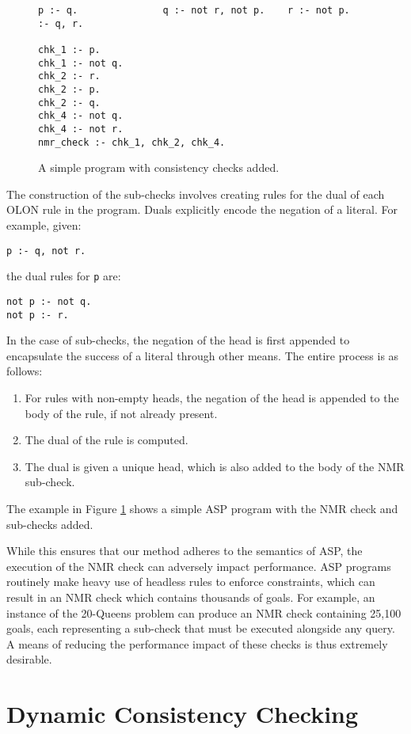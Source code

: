 \documentclass{new_tlp}
\begin{document}
\begin{figure}
\figrule
\begin{verbatim}
p :- q.               q :- not r, not p.    r :- not p.           :- q, r.              

chk_1 :- p.
chk_1 :- not q.
chk_2 :- r.
chk_2 :- p.
chk_2 :- q.
chk_4 :- not q.
chk_4 :- not r.
nmr_check :- chk_1, chk_2, chk_4.
\end{verbatim}
\caption{A simple program with consistency checks added.} \label{fig:nmrexample}
\figrule
\end{figure}

The construction of the sub-checks involves creating rules for the dual of each 
OLON rule in the program. Duals explicitly encode the negation of a literal.
For example, given:
\begin{verbatim}
p :- q, not r.
\end{verbatim}
\noindent the dual rules for \texttt{p} are:
\begin{verbatim}
not p :- not q.
not p :- r.
\end{verbatim}
\noindent In the case of sub-checks, the negation of the head is first appended 
to encapsulate the success of a literal through other means. The entire process 
is as follows:
\begin{enumerate}
\item For rules with non-empty heads, the negation of the head is appended to 
	the body of the rule, if not already present.
\item The dual of the rule is computed.
\item The dual is given a unique head, which is also added to the body of the 
	NMR sub-check.
\end{enumerate}
The example in Figure \ref{fig:nmrexample} shows a simple ASP program with the 
NMR check and sub-checks added.

While this ensures that our method adheres to the semantics of ASP, the
execution of the NMR check can adversely impact performance. ASP programs
routinely make heavy use of headless rules to enforce constraints, which can
result in an NMR check which contains thousands of goals. For example, an
instance of the 20-Queens problem can produce an NMR check containing 25,100
goals, each representing a sub-check that must be executed alongside any query.
A means of reducing the performance impact of these checks is thus extremely
desirable.


\section{Dynamic Consistency Checking} \label{sec:dcc}
\end{document}
